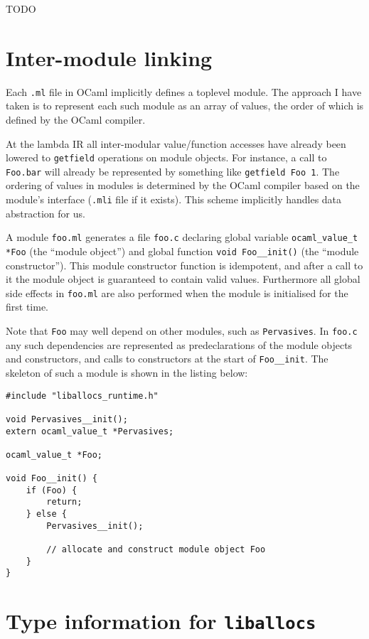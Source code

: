 \documentclass[12pt,a4paper,twoside,openright]{report}
\begin{document}
TODO

\section{Inter-module linking}

Each \lstinline!.ml! file in OCaml implicitly defines a toplevel module. The
approach I have taken is to represent each such module as an array of values,
the order of which is defined by the OCaml compiler.

At the lambda IR all inter-modular value/function accesses have already been
lowered to \lstinline!getfield! operations on module objects. For instance, a
call to \lstinline!Foo.bar! will already be represented by something like
\lstinline!getfield Foo 1!. The ordering of values in modules is determined by
the OCaml compiler based on the module's interface (\lstinline!.mli! file if it
exists). This scheme implicitly handles data abstraction for us.

A module \lstinline!foo.ml! generates a file \lstinline!foo.c! declaring global
variable \lstinline!ocaml_value_t *Foo! (the ``module object'') and global
function \lstinline!void Foo__init()! (the ``module constructor''). This module
constructor function is idempotent, and after a call to it the module object is
guaranteed to contain valid values. Furthermore all global side effects in
\lstinline!foo.ml! are also performed when the module is initialised for the
first time.

Note that \lstinline!Foo! may well depend on other modules, such as
\lstinline!Pervasives!. In \lstinline!foo.c! any such dependencies are
represented as predeclarations of the module objects and constructors, and
calls to constructors at the start of \lstinline!Foo__init!. The skeleton of
such a module is shown in the listing below:

\begin{lstlisting}
#include "liballocs_runtime.h"

void Pervasives__init();
extern ocaml_value_t *Pervasives;

ocaml_value_t *Foo;

void Foo__init() {
    if (Foo) {
        return;
    } else {
        Pervasives__init();

        // allocate and construct module object Foo
    }
}
\end{lstlisting}

\section{Type information for \texttt{liballocs}}\label{type-information-for-liballocs}
\end{document}
